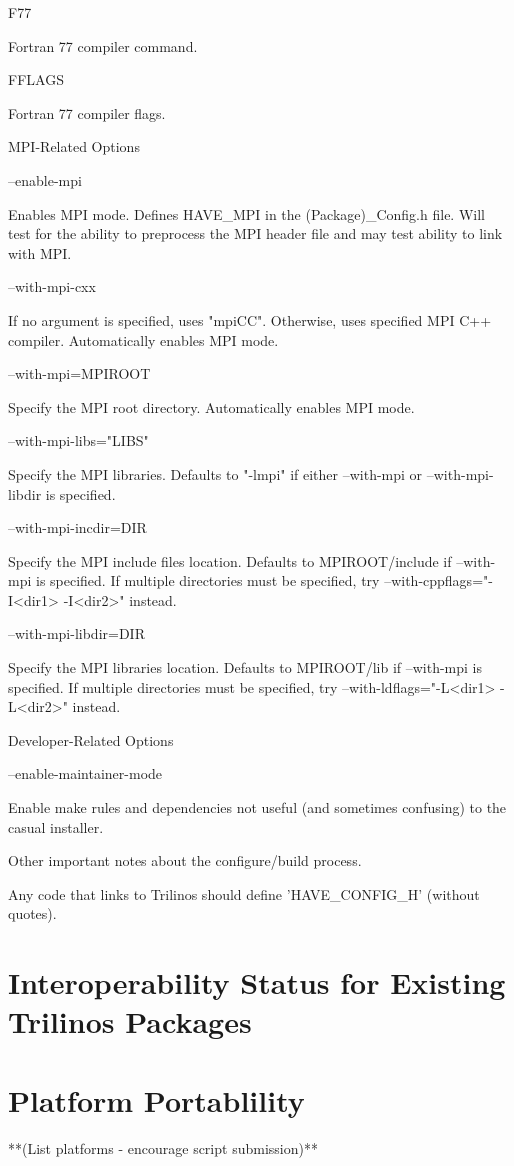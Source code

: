 \documentclass[12pt,relax]{TrilinosDevGuide}
\begin{document}
\bullet F77 

Fortran 77 compiler command.

\bullet FFLAGS 

Fortran 77 compiler flags.

\triangleright MPI-Related Options

\bullet --enable-mpi 

Enables MPI mode. Defines HAVE_MPI in the (Package)_Config.h file. Will test 
for the ability to preprocess the MPI header file and may test ability to link 
with MPI.

\bullet --with-mpi-cxx 

If no argument is specified, uses "mpiCC". Otherwise, uses specified MPI C++
compiler. Automatically enables MPI mode. 

\bullet --with-mpi=MPIROOT 

Specify the MPI root directory. Automatically enables MPI mode. 

\bullet --with-mpi-libs="LIBS" 

Specify the MPI libraries. Defaults to "-lmpi" if either --with-mpi or 
--with-mpi-libdir is specified.

\bullet --with-mpi-incdir=DIR

Specify the MPI include files location. Defaults to MPIROOT/include if 
--with-mpi is specified. If multiple directories  must be specified, try 
--with-cppflags="-I<dir1> -I<dir2>" instead.

\bullet --with-mpi-libdir=DIR 

Specify the MPI libraries location. Defaults to MPIROOT/lib if --with-mpi 
is specified. If multiple directories must be specified, try 
--with-ldflags="-L<dir1> -L<dir2>" instead. 

   Developer-Related Options

\bullet --enable-maintainer-mode 

Enable make rules and dependencies not useful (and sometimes confusing) to 
the casual installer.

\triangleright Other important notes about the configure/build process.

\circ Any code that links to Trilinos should define 'HAVE_CONFIG_H' (without
quotes).

	\chapter{Interoperability Status for Existing Trilinos Packages}

	\chapter{Platform Portablility}
	**(List platforms - encourage script submission)**
    \clearpage
    
    

\end{document}
